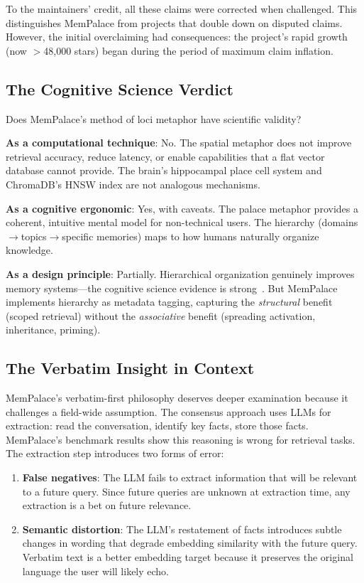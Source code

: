 \documentclass[twoside,11pt]{article}
\begin{document}
To the maintainers' credit, all these claims were corrected when challenged.
This distinguishes MemPalace from projects that double down on disputed claims.
However, the initial overclaiming had consequences: the project's rapid
growth (now $>$48{,}000 stars) began during the period of maximum claim
inflation.

\subsection{The Cognitive Science Verdict}

Does MemPalace's method of loci metaphor have scientific validity?

\textbf{As a computational technique}: No.  The spatial metaphor does not
improve retrieval accuracy, reduce latency, or enable capabilities that a flat
vector database cannot provide.  The brain's hippocampal place cell system and
ChromaDB's HNSW index are not analogous mechanisms.

\textbf{As a cognitive ergonomic}: Yes, with caveats.  The palace metaphor
provides a coherent, intuitive mental model for non-technical users.  The
hierarchy (domains$\to$topics$\to$specific memories) maps to how humans
naturally organize knowledge.

\textbf{As a design principle}: Partially.  Hierarchical organization
genuinely improves memory systems---the cognitive science evidence is
strong~\citep{collins1969,collins1975,schapiro2017,collin2020}.  But
MemPalace implements hierarchy as metadata tagging, capturing the
\emph{structural} benefit (scoped retrieval) without the \emph{associative}
benefit (spreading activation, inheritance, priming).

\subsection{The Verbatim Insight in Context}
\label{sec:verbatim}

MemPalace's verbatim-first philosophy deserves deeper examination because it
challenges a field-wide assumption.  The consensus approach uses LLMs for
extraction: read the conversation, identify key facts, store those facts.
MemPalace's benchmark results show this reasoning is wrong for retrieval tasks.
The extraction step introduces two forms of error:

\begin{enumerate}[leftmargin=*]
\item \textbf{False negatives}: The LLM fails to extract information that will
  be relevant to a future query.  Since future queries are unknown at
  extraction time, any extraction is a bet on future relevance.

\item \textbf{Semantic distortion}: The LLM's restatement of facts introduces
  subtle changes in wording that degrade embedding similarity with the future
  query.  Verbatim text is a better embedding target because it preserves the
  original language the user will likely echo.
\end{enumerate}
\end{document}

